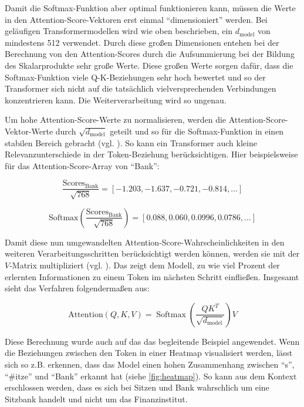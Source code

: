 Damit die Softmax-Funktion aber optimal funktionieren kann, müssen die Werte in den Attention-Score-Vektoren erst einmal \enquote{dimensioniert} werden.
Bei geläufigen Transformermodellen wird wie oben beschrieben, ein \( d_{\text{model}} \) von mindestens 512 verwendet.
Durch diese großen Dimensionen entehen bei der Berechnung von den Attention-Scores durch die Aufsummierung bei der Bildung des Skalarprodukte sehr große Werte.
Diese großen Werte sorgen dafür, dass die Softmax-Funktion viele Q-K-Beziehungen sehr hoch bewertet und so der Transformer sich nicht auf die tatsächlich vielversprechenden Verbindungen konzentrieren kann.
Die Weiterverarbeitung wird so ungenau.

Um hohe Attention-Score-Werte zu normalisieren, werden die Attention-Score-Vektor-Werte durch \( \sqrt{d_{\text{model}}} \) geteilt und so für die Softmax-Funktion in einen stabilen Bereich gebracht (vgl. \cite[S. 4]{attention}).
So kann ein Transformer auch kleine Relevanzunterschiede in der Token-Beziehung berücksichtigen.
Hier beispielsweise für das Attention-Score-Array von \enquote{Bank}:

\[
\frac{\text{Scores}_{\text{Bank}}}{\sqrt{768}} = [-1.203, -1.637, -0.721, -0.814, \dots]
\]

\[
\text{Softmax}\left(\frac{\text{Scores}_{\text{Bank}}}{\sqrt{768}}\right) = [0.088, 0.060, 0.0996, 0.0786, \dots]
\]

Damit diese nun umgewandelten Attention-Score-Wahrscheinlichkeiten in den weiteren Verarbeitungsschritten berücksichtigt werden können, werden sie mit der \( V \)-Matrix multipliziert (vgl. \cite[S. 4]{attention}). 
Das zeigt dem Modell, zu wie viel Prozent der erlernten Informationen zu einem Token im nächsten Schritt einfließen.
Insgesamt sieht das Verfahren folgendermaßen aus:

\[
\text{Attention}(Q, K, V) = \operatorname{Softmax}\left(\frac{QK^T}{\sqrt{d_{\text{model}}}}\right) V
\]

Diese Berechnung wurde auch auf das das begleitende Beispiel angewendet.
Wenn die Beziehungen zwischen den Token in einer Heatmap visualisiert werden, lässt sich so z.B. erkennen, dass das Model einen hohen Zusammenhang zwischen \enquote{s}, \enquote{#itze} und \enquote{Bank} erkannt hat (siehe \ref{fig:heatmap}). 
So kann aus dem Kontext erschlossen werden, dass es sich bei Sitzen und Bank wahrschlich um eine Sitzbank handelt und nicht um das Finanzinstitut.

